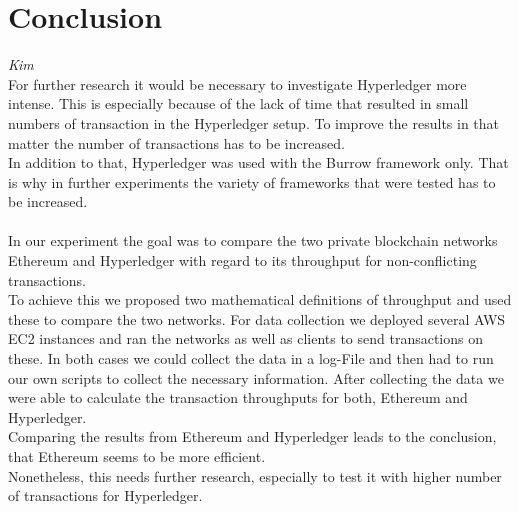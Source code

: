 \section{Conclusion}
\textit{Kim}\\
For further research it would be necessary to investigate Hyperledger more intense. This is especially because of the lack of time that resulted in small numbers of transaction in the Hyperledger setup. To improve the results in that matter the number of transactions has to be increased.\\
In addition to that, Hyperledger was used with the Burrow framework only. That is why in further experiments the variety of frameworks that were tested has to be increased.\\
\\
In our experiment the goal was to compare the two private blockchain networks Ethereum and Hyperledger with regard to its throughput for non-conflicting transactions.\\
To achieve this we proposed two mathematical definitions of throughput and used these to compare the two networks. For data collection we deployed several AWS EC2 instances and ran the networks as well as clients to send transactions on these. In both cases we could collect the data in a log-File and then had to run our own scripts to collect the necessary information. After collecting the data we were able to calculate the transaction throughputs for both, Ethereum and Hyperledger.\\
Comparing the results from Ethereum and Hyperledger leads to the conclusion, that Ethereum seems to be more efficient. \\
Nonetheless, this needs further research, especially to test it with higher number of transactions for Hyperledger.